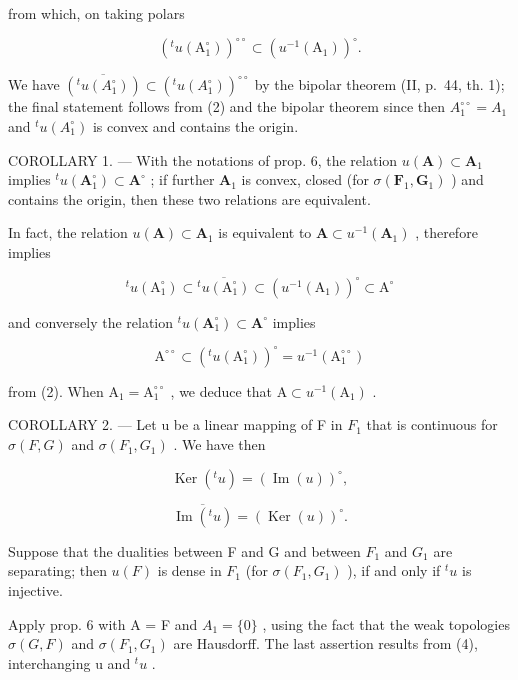 from which, on taking polars

\[
\left(^ {t} u \left(\mathrm{A} _ {1} ^ {\circ}\right)\right) ^ {\circ \circ} \subset \left(u ^ {- 1} \left(\mathrm{A} _ {1}\right)\right) ^ {\circ}.
\]

We have \(\overline{(^t u(A_1^\circ))} \subset (^{t}u(A_1^\circ))^{\circ \circ}\) by the bipolar theorem (II, p.~44, th. 1); the final statement follows from (2) and the bipolar theorem since then \(A_1^{\circ \circ} = A_1\) and \(^t u(A_1^\circ)\) is convex and contains the origin.

COROLLARY 1. --- With the notations of prop. 6, the relation \(u(\mathbf{A}) \subset \mathbf{A}_1\) implies \(^t u(\mathbf{A}_1^\circ) \subset \mathbf{A}^\circ\) ; if further \(\mathbf{A}_1\) is convex, closed (for \(\sigma(\mathbf{F}_1, \mathbf{G}_1)\) ) and contains the origin, then these two relations are equivalent.

In fact, the relation \(u(\mathbf{A}) \subset \mathbf{A}_1\) is equivalent to \(\mathbf{A} \subset u^{-1}(\mathbf{A}_1)\) , therefore implies

\[
{ } ^ { t } u ( \mathrm{A} _ { 1 } ^ { \circ } ) \subset \overline { { { ^ { t } u ( \mathrm{A} _ { 1 } ^ { \circ } ) } } } \subset ( u ^ { - 1 } ( \mathrm{A} _ { 1 } ) ) ^ { \circ } \subset \mathrm{A} ^ { \circ }
\]

and conversely the relation \({}^t u(\mathbf{A}_1^\circ) \subset \mathbf{A}^\circ\) implies

\[
\mathrm{A} ^ {\circ \circ} \subset \left(^ {t} u (\mathrm{A} _ {1} ^ {\circ})\right) ^ {\circ} = u ^ {- 1} (\mathrm{A} _ {1} ^ {\circ \circ})
\]

from (2). When \(\mathrm{A}_1 = \mathrm{A}_1^{\circ \circ}\) , we deduce that \(\mathrm{A} \subset u^{-1}(\mathrm{A}_1)\) .

COROLLARY 2. --- Let u be a linear mapping of F in \(F_{1}\) that is continuous for \(\sigma(F, G)\) and \(\sigma(F_{1}, G_{1})\) . We have then

\[
\operatorname{Ker} (^ {t} u) = (\operatorname{Im} (u)) ^ {\circ},\tag{3}
\]

\[
\overline {{\operatorname{Im} (^ {t} u)}} = (\operatorname{Ker} (u)) ^ {\circ}.\tag{4}
\]

Suppose that the dualities between F and G and between \(F_{1}\) and \(G_{1}\) are separating; then \(u(F)\) is dense in \(F_{1}\) (for \(\sigma(F_{1}, G_{1})\) ), if and only if \(^{t}u\) is injective.

Apply prop. 6 with A = F and \(A_{1} = \{0\}\) , using the fact that the weak topologies \(\sigma(G, F)\) and \(\sigma(F_{1}, G_{1})\) are Hausdorff. The last assertion results from (4), interchanging u and \(^{t}u\) .
\relax{}
